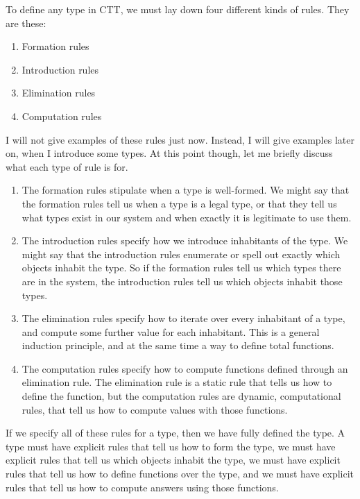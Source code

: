 \documentclass{article}
\begin{document}
To define any type in CTT, we must lay down four different kinds of rules. They are these:

\begin{enumerate}
  \item{Formation rules}
  \item{Introduction rules}
  \item{Elimination rules}
  \item{Computation rules}
\end{enumerate}

I will not give examples of these rules just now. Instead, I will give examples later on, when I introduce some types. At this point though, let me briefly discuss what each type of rule is for.

\begin{enumerate}

  \item{The formation rules stipulate when a type is well-formed. We might say that the formation rules tell us when a type is a legal type, or that they tell us what types exist in our system and when exactly it is legitimate to use them.}

  \item{The introduction rules specify how we introduce inhabitants of the type. We might say that the introduction rules enumerate or spell out exactly which objects inhabit the type. So if the formation rules tell us which types there are in the system, the introduction rules tell us which objects inhabit those types.}

  \item{The elimination rules specify how to iterate over every inhabitant of a type, and compute some further value for each inhabitant. This is a general induction principle, and at the same time a way to define total functions.}

  \item{The computation rules specify how to compute functions defined through an elimination rule. The elimination rule is a static rule that tells us how to define the function, but the computation rules are dynamic, computational rules, that tell us how to compute values with those functions.}

\end{enumerate}

If we specify all of these rules for a type, then we have fully defined the type. A type must have explicit rules that tell us how to form the type, we must have explicit rules that tell us which objects inhabit the type, we must have explicit rules that tell us how to define functions over the type, and we must have explicit rules that tell us how to compute answers using those functions.
\end{document}
